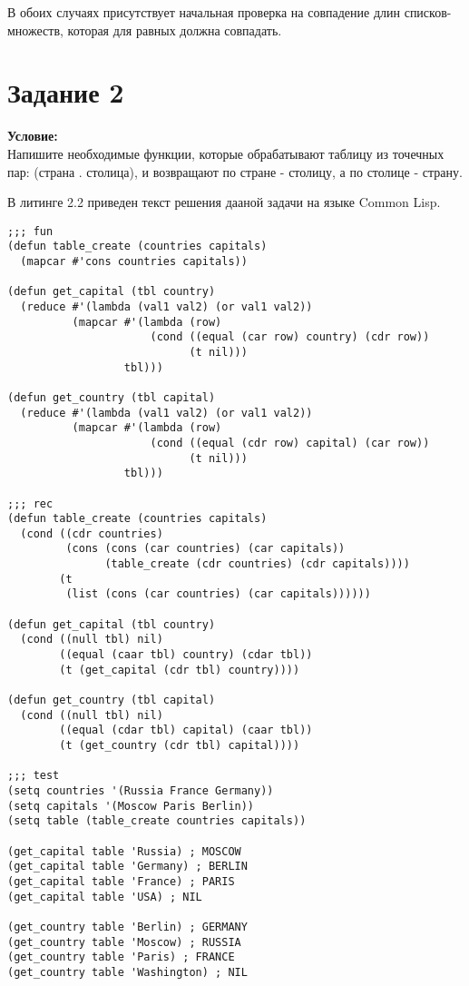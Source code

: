 В обоих случаях присутствует начальная проверка на совпадение длин списков-множеств, которая для равных должна совпадать.

\section{Задание \No{}2}
\textbf{Условие:}\\Напишите необходимые функции, которые обрабатывают таблицу из точечных пар: (страна . столица), и возвращают по стране - столицу, а по столице - страну.

В литинге 2.2 приведен текст решения дааной задачи на языке Common Lisp.

\begin{lstlisting}[caption={Задание \No{}2}]
;;; fun
(defun table_create (countries capitals)
  (mapcar #'cons countries capitals))

(defun get_capital (tbl country)
  (reduce #'(lambda (val1 val2) (or val1 val2))
          (mapcar #'(lambda (row)
                      (cond ((equal (car row) country) (cdr row))
                            (t nil)))
                  tbl)))

(defun get_country (tbl capital)
  (reduce #'(lambda (val1 val2) (or val1 val2))
          (mapcar #'(lambda (row)
                      (cond ((equal (cdr row) capital) (car row))
                            (t nil)))
                  tbl)))

;;; rec
(defun table_create (countries capitals)
  (cond ((cdr countries)
         (cons (cons (car countries) (car capitals))
               (table_create (cdr countries) (cdr capitals))))
        (t
         (list (cons (car countries) (car capitals))))))

(defun get_capital (tbl country)
  (cond ((null tbl) nil)
        ((equal (caar tbl) country) (cdar tbl))
        (t (get_capital (cdr tbl) country))))

(defun get_country (tbl capital)
  (cond ((null tbl) nil)
        ((equal (cdar tbl) capital) (caar tbl))
        (t (get_country (cdr tbl) capital))))

;;; test
(setq countries '(Russia France Germany))
(setq capitals '(Moscow Paris Berlin))
(setq table (table_create countries capitals))

(get_capital table 'Russia) ; MOSCOW
(get_capital table 'Germany) ; BERLIN
(get_capital table 'France) ; PARIS
(get_capital table 'USA) ; NIL

(get_country table 'Berlin) ; GERMANY
(get_country table 'Moscow) ; RUSSIA
(get_country table 'Paris) ; FRANCE
(get_country table 'Washington) ; NIL
\end{lstlisting}

